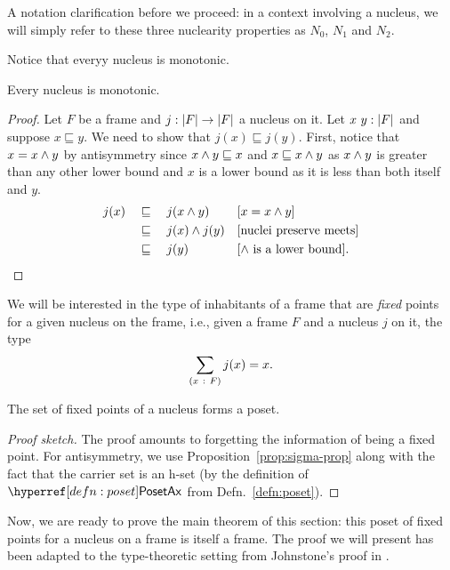 A notation clarification before we proceed: in a context involving a nucleus, we will
simply refer to these three nuclearity properties as $N_0$, $N_1$ and $N_2$.

Notice that everyy nucleus is monotonic.
\begin{prop}\label{prop:nucleus-mono}
  Every nucleus is monotonic.
\end{prop}
\begin{proof}
  Let $F$ be a frame and $j : \left| F \right| \rightarrow \left| F \right|$ a nucleus on it. Let
  $x~y:\left| F \right|$ and suppose $x \sqsubseteq y$. We need to show that $j(x) \sqsubseteq j(y)$. First,
  notice that $x = x \wedge y$ by antisymmetry since $x \wedge y \sqsubseteq x$ and $x \sqsubseteq
  x \wedge y$ as $x \wedge y$ is greater than any other lower bound and $x$ is a lower
  bound as it is less than both itself and $y$.
  \begin{align*}
    j(x) &\quad\sqsubseteq\quad j(x \wedge y)                 && [x = x \wedge y]                      \\
         &\quad\sqsubseteq\quad j(x) \wedge j(y)              && [\text{nuclei preserve meets}]         \\
         &\quad\sqsubseteq\quad {j(y)}                         && [\text{$\wedge$ is a lower bound}]  .
  \end{align*}
\end{proof}

We will be interested in the type of inhabitants of a frame that are \emph{fixed} points
for a given nucleus on the frame, i.e., given a frame $F$ and a nucleus $j$ on it,
the type $$\sum_{(x~:~F)} j(x) = x.$$

\begin{prop}
  The set of fixed points of a nucleus forms a poset.
\end{prop}
\begin{proof}[Proof sketch]
  The proof amounts to forgetting the information of being a fixed point. For
  antisymmetry, we use Proposition~\ref{prop:sigma-prop} along with the fact that the
  carrier set is an h-set (by the definition of $\posetaxnm{}$ from
  Defn.~\ref{defn:poset}).
\end{proof}

Now, we are ready to prove the main theorem of this section: this poset of fixed points
for a nucleus on a frame is itself a frame. The proof we will present has been adapted to
the type-theoretic setting from Johnstone's proof in \cite[II.2.2, pg.~49]{stone-spaces}.

